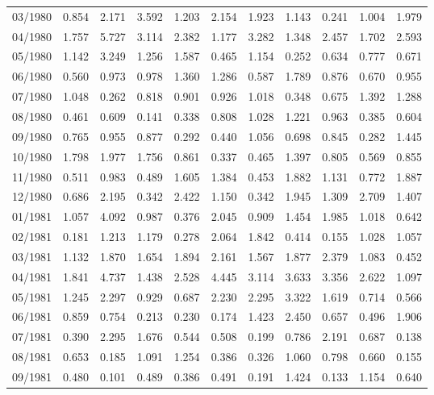 \begin{tabular}{lrrrrrrrrrr}
03/1980 &  0.854 &  2.171 &  3.592 &  1.203 &  2.154 &  1.923 &  1.143 &  0.241 &  1.004 &  1.979 \\
04/1980 &  1.757 &  5.727 &  3.114 &  2.382 &  1.177 &  3.282 &  1.348 &  2.457 &  1.702 &  2.593 \\
05/1980 &  1.142 &  3.249 &  1.256 &  1.587 &  0.465 &  1.154 &  0.252 &  0.634 &  0.777 &  0.671 \\
06/1980 &  0.560 &  0.973 &  0.978 &  1.360 &  1.286 &  0.587 &  1.789 &  0.876 &  0.670 &  0.955 \\
07/1980 &  1.048 &  0.262 &  0.818 &  0.901 &  0.926 &  1.018 &  0.348 &  0.675 &  1.392 &  1.288 \\
08/1980 &  0.461 &  0.609 &  0.141 &  0.338 &  0.808 &  1.028 &  1.221 &  0.963 &  0.385 &  0.604 \\
09/1980 &  0.765 &  0.955 &  0.877 &  0.292 &  0.440 &  1.056 &  0.698 &  0.845 &  0.282 &  1.445 \\
10/1980 &  1.798 &  1.977 &  1.756 &  0.861 &  0.337 &  0.465 &  1.397 &  0.805 &  0.569 &  0.855 \\
11/1980 &  0.511 &  0.983 &  0.489 &  1.605 &  1.384 &  0.453 &  1.882 &  1.131 &  0.772 &  1.887 \\
12/1980 &  0.686 &  2.195 &  0.342 &  2.422 &  1.150 &  0.342 &  1.945 &  1.309 &  2.709 &  1.407 \\
01/1981 &  1.057 &  4.092 &  0.987 &  0.376 &  2.045 &  0.909 &  1.454 &  1.985 &  1.018 &  0.642 \\
02/1981 &  0.181 &  1.213 &  1.179 &  0.278 &  2.064 &  1.842 &  0.414 &  0.155 &  1.028 &  1.057 \\
03/1981 &  1.132 &  1.870 &  1.654 &  1.894 &  2.161 &  1.567 &  1.877 &  2.379 &  1.083 &  0.452 \\
04/1981 &  1.841 &  4.737 &  1.438 &  2.528 &  4.445 &  3.114 &  3.633 &  3.356 &  2.622 &  1.097 \\
05/1981 &  1.245 &  2.297 &  0.929 &  0.687 &  2.230 &  2.295 &  3.322 &  1.619 &  0.714 &  0.566 \\
06/1981 &  0.859 &  0.754 &  0.213 &  0.230 &  0.174 &  1.423 &  2.450 &  0.657 &  0.496 &  1.906 \\
07/1981 &  0.390 &  2.295 &  1.676 &  0.544 &  0.508 &  0.199 &  0.786 &  2.191 &  0.687 &  0.138 \\
08/1981 &  0.653 &  0.185 &  1.091 &  1.254 &  0.386 &  0.326 &  1.060 &  0.798 &  0.660 &  0.155 \\
09/1981 &  0.480 &  0.101 &  0.489 &  0.386 &  0.491 &  0.191 &  1.424 &  0.133 &  1.154 &  0.640 \\

\end{tabular}
